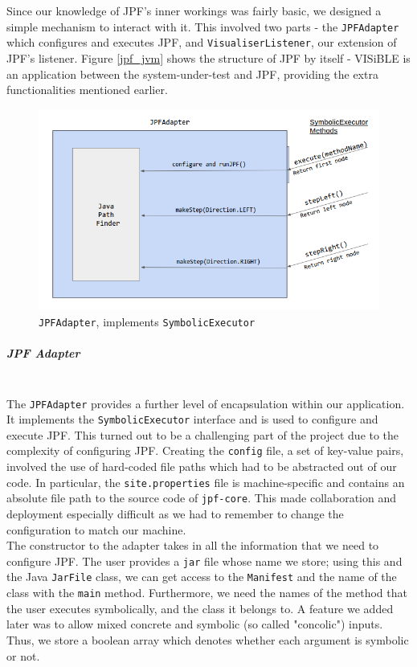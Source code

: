 \documentclass[titlepage,11pt]{article}
\begin{document}
Since our knowledge of JPF's inner workings was fairly basic, we designed a simple mechanism to interact with it. This involved two parts - the \texttt{JPFAdapter} which configures and executes JPF, and \texttt{VisualiserListener}, our extension of JPF's listener. Figure \ref{jpf_jvm} shows the structure of JPF by itself - VISiBLE is an application between the system-under-test and JPF, providing the extra functionalities mentioned earlier. 

\begin{figure}
\centering
\includegraphics[scale=0.6]{adapter.png}
\caption{\texttt{JPFAdapter}, implements \texttt{SymbolicExecutor}} 
\end{figure}

\subparagraph*{\textbf{JPF Adapter}}\mbox{}\\

The \texttt{JPFAdapter} provides a further level of encapsulation within our application. It implements the \texttt{SymbolicExecutor} interface and is used to configure and execute JPF. This turned out to be a challenging part of the project due to the complexity of configuring JPF. Creating the \texttt{config} file, a set of key-value pairs, involved the use of hard-coded file paths which had to be abstracted out of our code. In particular, the \texttt{site.properties} file is machine-specific and contains an absolute file path to the source code of \texttt{jpf-core}. This made collaboration and deployment especially difficult as we had to remember to change the configuration to match our machine. \\

The constructor to the adapter takes in all the information that we need to configure JPF. The user provides a \texttt{jar} file whose name we store; using this and the Java \texttt{JarFile} class, we can get access to the \texttt{Manifest} and the name of the class with the \texttt{main} method. Furthermore, we need the names of the method that the user executes symbolically, and the class it belongs to. A feature we added later was to allow mixed concrete and symbolic (so called "concolic") inputs. Thus, we store a boolean array which denotes whether each argument is symbolic or not. \\
\end{document}
